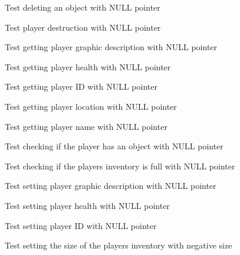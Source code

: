 \begin{DoxyRefList}
Test deleting an object with NULL pointer  
\item[Global \doxylink{player__test_8c_ae873be01647faf96d3906aa9629e87f0}{test2\+\_\+player\+\_\+destroy} ()]\label{test__test000134}%
%
Test player destruction with NULL pointer  
\item[Global \doxylink{player__test_8c_a3e24aeaf9e9cb432d3705df47c840aa4}{test2\+\_\+player\+\_\+get\+\_\+gdesc} ()]\label{test__test000163}%
%
Test getting player graphic description with NULL pointer  
\item[Global \doxylink{player__test_8c_a0d0d1c26e649578825cab7206d78b5c5}{test2\+\_\+player\+\_\+get\+\_\+health} ()]\label{test__test000155}%
%
Test getting player health with NULL pointer  
\item[Global \doxylink{player__test_8c_a9fa80f0c0e46b45eb9f1685b102a5826}{test2\+\_\+player\+\_\+get\+\_\+id} ()]\label{test__test000136}%
%
Test getting player ID with NULL pointer  
\item[Global \doxylink{player__test_8c_a4c5605fac4bd716e1dfb2744db4fa8a1}{test2\+\_\+player\+\_\+get\+\_\+location} ()]\label{test__test000159}%
%
Test getting player location with NULL pointer  
\item[Global \doxylink{player__test_8c_a3aa908fd360b74e7786422260e8e16a0}{test2\+\_\+player\+\_\+get\+\_\+name} ()]\label{test__test000140}%
%
Test getting player name with NULL pointer  
\item[Global \doxylink{player__test_8c_ae8953d45d8f555a930dbc8aba101d399}{test2\+\_\+player\+\_\+has\+\_\+object} ()]\label{test__test000148}%
%
Test checking if the player has an object with NULL pointer  
\item[Global \doxylink{player__test_8c_a40004ac535720ce3052b91ed16e8c128}{test2\+\_\+player\+\_\+inventory\+\_\+is\+\_\+full} ()]\label{test__test000150}%
%
Test checking if the player\textquotesingle{}s inventory is full with NULL pointer  
\item[Global \doxylink{player__test_8c_a15bf1f99a096b1789e1a43bc9bf6d2fb}{test2\+\_\+player\+\_\+set\+\_\+gdesc} ()]\label{test__test000165}%
%
Test setting player graphic description with NULL pointer  
\item[Global \doxylink{player__test_8c_aca602481af023c45a1fe6825860aa184}{test2\+\_\+player\+\_\+set\+\_\+health} ()]\label{test__test000157}%
%
Test setting player health with NULL pointer  
\item[Global \doxylink{player__test_8c_a3695e0896bc3d770290e6a691fa212f7}{test2\+\_\+player\+\_\+set\+\_\+id} ()]\label{test__test000138}%
%
Test setting player ID with NULL pointer  
\item[Global \doxylink{player__test_8c_aafc4e9c4346f41f1542cc5fba33951f7}{test2\+\_\+player\+\_\+set\+\_\+inventory\+\_\+size} ()]\label{test__test000153}%
%
Test setting the size of the player\textquotesingle{}s inventory with negative size 


\end{DoxyRefList}
